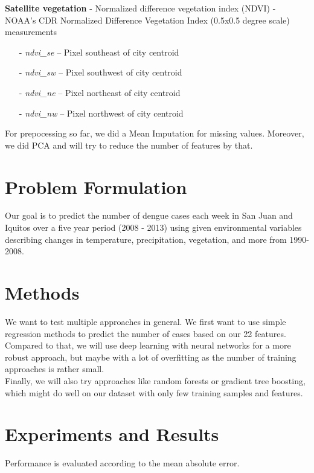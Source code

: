 \documentclass[english]{article}
\begin{document}
\textbf{Satellite vegetation} - Normalized difference vegetation index (NDVI) - NOAA's CDR Normalized Difference Vegetation Index (0.5x0.5 degree scale) measurements
\begin{itemize}
    \item[-] \textit{ndvi\_se} -- Pixel southeast of city centroid
    \item[-] \textit{ndvi\_sw} -- Pixel southwest of city centroid
    \item[-] \textit{ndvi\_ne} -- Pixel northeast of city centroid
    \item[-] \textit{ndvi\_nw} -- Pixel northwest of city centroid
\end{itemize}

For prepocessing so far, we did a Mean Imputation for missing values. Moreover, we did PCA and will try to reduce the number of features by that. 

\section{Problem Formulation}

Our goal is to predict the number of dengue cases each week in San Juan and Iquitos over a five year period (2008 - 2013) using given environmental variables describing changes in temperature, precipitation, vegetation, and more from 1990-2008.


\section{Methods}

We want to test multiple approaches in general.
We first want to use simple regression methods to predict the number of cases based on our 22 features. \\
Compared to that, we will use deep learning with neural networks for a more robust approach, but maybe with a lot of overfitting as the number of training approaches is rather small.\\
Finally, we will also try approaches like random forests or gradient tree boosting, which might do well on our dataset with only few training samples and features.

\section{Experiments and Results}

Performance is evaluated according to the mean absolute error.
\end{document}
